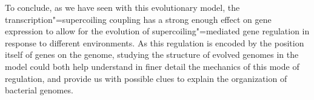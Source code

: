To conclude, as we have seen with this evolutionary model, the transcription"=supercoiling coupling has a strong enough effect on gene expression to allow for the evolution of supercoiling"=mediated gene regulation in response to different environments.
As this regulation is encoded by the position itself of genes on the genome, studying the structure of evolved genomes in the model could both help understand in finer detail the mechanics of this mode of regulation, and provide us with possible clues to explain the organization of bacterial genomes.
